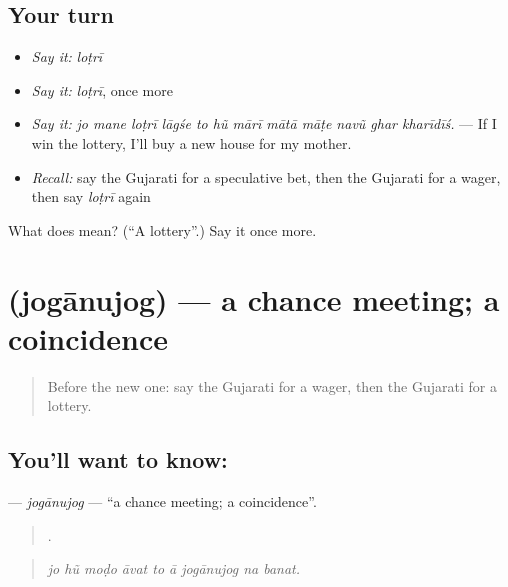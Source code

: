 \subsection*{Your turn}
\begin{itemize}
\raggedright
  \item \emph{Say it:} \emph{loṭrī}
  \item \emph{Say it:} \emph{loṭrī}, once more
  \item \emph{Say it:} \emph{jo mane loṭrī lāgśe to hũ mārī mātā māṭe navũ ghar kharīdīś.} — If I win the lottery, I'll buy a new house for my mother.
  \item \emph{Recall:} say the Gujarati for a speculative bet, then the Gujarati for a wager, then say \emph{loṭrī} again
\end{itemize}

\begin{tcolorbox}[breakable,colback=teal!4,colframe=teal!35!black,title={Before you move on}]
What does  mean? (\textquotedblleft{}A lottery\textquotedblright{}.) Say it once more.
\end{tcolorbox}
\section[\texorpdfstring{\gu{જોગાનુજોગ} (jogānujog)}{જોગાનુજોગ (jogānujog)}]{ (jogānujog) — a chance meeting; a coincidence}

\label{lesson:GU-C534-joganujog}



\begin{quote}
Before the new one: say the Gujarati for a wager, then the Gujarati for a lottery.
\end{quote}

\subsection*{You'll want to know: }
\textbf{} — \emph{jogānujog} — \textquotedblleft{}a chance meeting; a coincidence\textquotedblright{}.

\begin{quote}
        .
\end{quote}

\begin{quote}
\emph{jo hũ moḍo āvat to ā jogānujog na banat.}
\end{quote}

